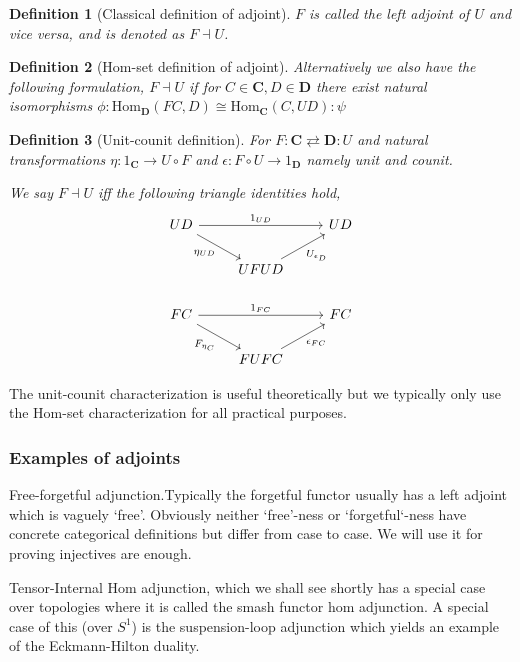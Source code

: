 \documentclass[12pt]{article}
\numberwithin{equation}{section}
\newtheorem{definition}{Definition}[section]
\begin{document}
\begin{appendices}
\begin{definition}[Classical definition of adjoint]
			$F$ is called the left adjoint of $U$ and vice versa, and is denoted as $F \dashv U$.
		\end{definition}
		
		\begin{definition}[Hom-set definition of adjoint]
			Alternatively we also have the following formulation, $F \dashv U$ if for $C\in \mathbf{C}, D \in \mathbf{D}$ there exist natural isomorphisms $\phi: \textrm{Hom}_\mathbf{D}(FC, D) \cong \textrm{Hom}_\mathbf{C}(C, UD):\psi$
		\end{definition}
		
		\begin{definition}[Unit-counit definition]
			For $F: \mathbf{C} \rightleftarrows \mathbf{D}:U$ and natural transformations $\eta: 1_\mathbf{C} \to U \circ F$ and $\epsilon: F \circ U \to 1_\mathbf{D}$ namely unit and counit. 
			
			We say $F \dashv U$ iff the following triangle identities hold,
			\[\begin{tikzcd}
				UD && UD \\
				& UFUD \\
				FC && FC \\
				& FUFC
				\arrow["{1_{UD}}", from=1-1, to=1-3]
				\arrow["{\eta_{UD}}"', from=1-1, to=2-2]
				\arrow["{U_{\epsilon_D}}"', from=2-2, to=1-3]
				\arrow["{1_{FC}}", from=3-1, to=3-3]
				\arrow["{F_{\eta_C}}"', from=3-1, to=4-2]
				\arrow["{\epsilon_{FC}}"', from=4-2, to=3-3]
			\end{tikzcd}\]
		\end{definition}
		The unit-counit characterization is useful theoretically but we typically only use the Hom-set characterization for all practical purposes.
		
		\subsubsection{Examples of adjoints}
		Free-forgetful adjunction.Typically the forgetful functor usually has a left adjoint which is vaguely `free'. Obviously neither `free'-ness or `forgetful`-ness have concrete categorical definitions but differ from case to case. We will use it for proving injectives are enough.
		
		Tensor-Internal Hom adjunction, which we shall see shortly has a special case over topologies where it is called the smash functor hom adjunction. A special case of this (over $S^1$) is the suspension-loop adjunction which yields an example of the Eckmann-Hilton duality. 
		

\end{appendices}
\end{document}
